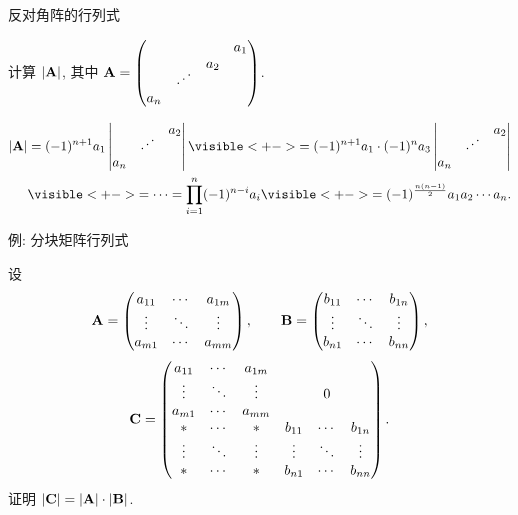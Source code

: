 \begin{frame}{反对角阵的行列式}
	\onslide<+->
	\begin{example}
		计算 $|{\mathbf{A}}|$, 其中 $\bfA=\begin{pmatrix}
			&&&a_1\\&&a_2&\\&\udots&&\\a_n&&&
		\end{pmatrix}$.
	\end{example}
	\onslide<+->
	\begin{solution*}
		\begin{align*}
			|\bfA|&=(-1)^{n+1}a_1\detm{&&a_2\\&\udots&\\a_n&&}
			\visible<+->{=(-1)^{n+1}a_1\cdot (-1)^{n}a_3\detm{&&a_2\\&\udots&\\a_n&&}}\\
			&\visible<+->{=\cdots=\prod_{i=1}^n (-1)^{n-i}a_i}
			\visible<+->{=(-1)^{\frac{n(n-1)}2}a_1a_2\cdots a_n.}
		\end{align*}
	\end{solution*}
\end{frame}


\begin{frame}{例: 分块矩阵行列式}
	\onslide<+->
	\begin{example}
		设
		\[{\mathbf{A}}=\begin{pmatrix}
			a_{11}&\cdots&a_{1m}\\
			\vdots&\ddots&\vdots\\
			a_{m1}&\cdots&a_{mm}\\
		\end{pmatrix},\qquad
		{\mathbf{B}}=\begin{pmatrix}
			b_{11}&\cdots&b_{1n}\\
			\vdots&\ddots&\vdots\\
			b_{n1}&\cdots&b_{nn}\\
		\end{pmatrix},\]
		\[{\mathbf{C}}=\begin{pmatrix}
			a_{11}&\cdots&a_{1m}&&&\\
			\vdots&\ddots&\vdots&&0&\\
			a_{m1}&\cdots&a_{mm}&&&\\
			*&\cdots&*&b_{11}&\cdots&b_{1n}\\
			\vdots&\ddots&\vdots&\vdots&\ddots&\vdots\\
			*&\cdots&*&b_{n1}&\cdots&b_{nn}\\
		\end{pmatrix}.\]
		证明 $|{\mathbf{C}}|=|{\mathbf{A}}|\cdot|{\mathbf{B}}|$.
	\end{example}
\end{frame}


